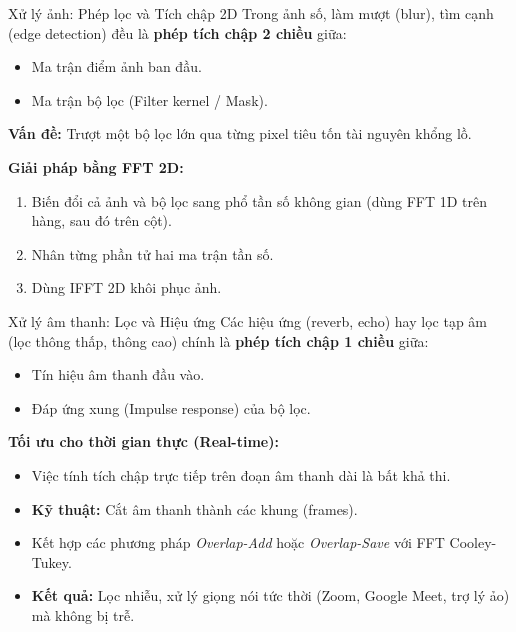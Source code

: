 \begin{frame}{Xử lý ảnh: Phép lọc và Tích chập 2D}
    Trong ảnh số, làm mượt (blur), tìm cạnh (edge detection) đều là \textbf{phép tích chập 2 chiều} giữa:
    \begin{itemize}
        \item Ma trận điểm ảnh ban đầu.
        \item Ma trận bộ lọc (Filter kernel / Mask).
    \end{itemize}
    \vspace{0.5cm}
    
    \textbf{Vấn đề:} Trượt một bộ lọc lớn qua từng pixel tiêu tốn tài nguyên khổng lồ.
    \vspace{0.3cm}
    
    \textbf{Giải pháp bằng FFT 2D:}
    \begin{enumerate}
        \item Biến đổi cả ảnh và bộ lọc sang phổ tần số không gian (dùng FFT 1D trên hàng, sau đó trên cột).
        \item Nhân từng phần tử hai ma trận tần số.
        \item Dùng IFFT 2D khôi phục ảnh.
    \end{enumerate}
\end{frame}

\begin{frame}{Xử lý âm thanh: Lọc và Hiệu ứng}
    Các hiệu ứng (reverb, echo) hay lọc tạp âm (lọc thông thấp, thông cao) chính là \textbf{phép tích chập 1 chiều} giữa:
    \begin{itemize}
        \item Tín hiệu âm thanh đầu vào.
        \item Đáp ứng xung (Impulse response) của bộ lọc.
    \end{itemize}
    \vspace{0.5cm}
    
    \textbf{Tối ưu cho thời gian thực (Real-time):}
    \begin{itemize}
        \item Việc tính tích chập trực tiếp trên đoạn âm thanh dài là bất khả thi.
        \item \textbf{Kỹ thuật:} Cắt âm thanh thành các khung (frames).
        \item Kết hợp các phương pháp \textit{Overlap-Add} hoặc \textit{Overlap-Save} với FFT Cooley-Tukey.
        \item \textbf{Kết quả:} Lọc nhiễu, xử lý giọng nói tức thời (Zoom, Google Meet, trợ lý ảo) mà không bị trễ.
    \end{itemize}
\end{frame}